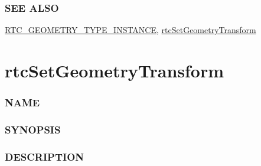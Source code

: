 \subsubsection{SEE ALSO}\label{see-also}

\hyperref[rtc_geometry_type_instance]{RTC\_GEOMETRY\_TYPE\_INSTANCE},
\hyperref[rtcsetgeometrytransform]{rtcSetGeometryTransform}

\pagebreak

\section{rtcSetGeometryTransform}\label{rtcsetgeometrytransform}

\subsubsection{NAME}\label{name}

\begin{Shaded}
\begin{Highlighting}[]
\OperatorTok{{-}}
\end{Highlighting}
\end{Shaded}

\subsubsection{SYNOPSIS}\label{synopsis}

\begin{Shaded}
\begin{Highlighting}[]

\OperatorTok{(}
\OperatorTok{,}
   \OperatorTok{,}
  \OperatorTok{,}
   \OperatorTok{*}
\OperatorTok{);}
\end{Highlighting}
\end{Shaded}

\subsubsection{DESCRIPTION}\label{description}

